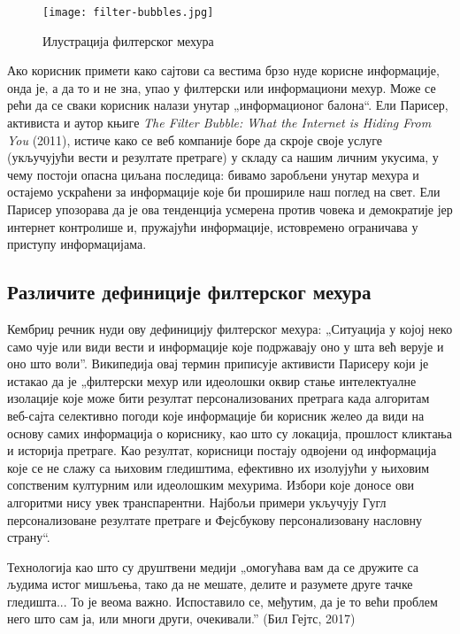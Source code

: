 \documentclass[a4paper]{article}
\begin{document}
\begin{figure}[hbt!]
\centering
\texttt{[image: filter-bubbles.jpg]}
\caption{Илустрација филтерског мехура}
\end{figure}

Ако корисник примети како сајтови са вестима брзо нуде корисне информације, онда је, а да то и не зна, упао у филтерски или информациони мехур. Може се рећи да се сваки корисник налази унутар „информационог балона“. Ели Парисер, активиста и аутор књиге \emph{The Filter Bubble: What the Internet is Hiding From You} (2011), истиче како се веб компаније боре да скроје своје услуге (укључујући вести и резултате претраге) у складу са нашим личним укусима, у чему постоји опасна циљана последица: бивамо заробљени унутар мехура и остајемо ускраћени за информације које би прошириле наш поглед на свет. Ели Парисер упозорава да је ова тенденција усмерена против човека и демократије јер интернет контролише и, пружајући информације, истовремено ограничава у приступу информацијама\cite{pariser}.

\subsection{Различите дефиниције филтерског мехура}
\label{subsec:podnaslov4}

Кембриџ речник нуди ову дефиницију филтерског мехура: „Ситуација у којој неко само чује или види вести и информације које подржавају оно у шта већ верује и оно што воли”\cite{dictionary}. Википедија овај термин приписује активисти Парисеру који је истакао да је „филтерски мехур или идеолошки оквир стање интелектуалне изолације које може бити резултат персонализованих претрага када алгоритам веб-сајта селективно погоди које информације би корисник желео да види на основу самих информација о кориснику, као што су локација, прошлост кликтања и историја претраге. Као резултат, корисници постају одвојени од информација које се не слажу са њиховим гледиштима, ефективно их изолујући у њиховим сопственим културним или идеолошким мехурима. Избори које доносе ови алгоритми нису увек транспарентни. Најбољи примери укључују Гугл персонализоване резултате претраге и Фејсбукову персонализовану насловну страну“.\cite{wiki}

Технологија као што су друштвени медији „омогућава вам да се дружите са људима истог мишљења, тако да не мешате, делите и разумете друге тачке гледишта... То је веома важно. Испоставило се, међутим, да је то већи проблем него што сам ја, или многи други, очекивали.” (Бил Гејтс, 2017)
\end{document}
